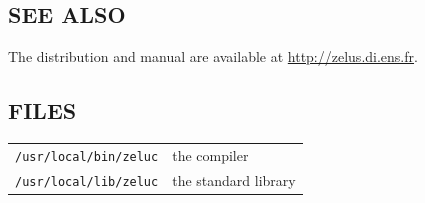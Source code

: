 \documentclass[11pt,titlepage,twoside]{report}
\begin{document}
\subsection*{SEE ALSO}

The distribution and manual are available at \url{http://zelus.di.ens.fr}.

\subsection*{FILES}

\begin{tabular}{ll}
{\tt /usr/local/bin/zeluc}           & the compiler
\\
{\tt /usr/local/lib/zeluc} & the standard library
\end{tabular}



\end{document}
